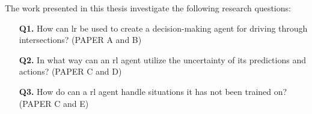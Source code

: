 
The work presented in this thesis investigate the following research questions:
\begin{enumerate}
	\item[\textbf{Q1.}] How can \gls{lr} be used to create a decision-making agent for driving through intersections? (PAPER A and B)
	\item[\textbf{Q2.}] In what way can an \gls{rl} agent utilize the uncertainty of its predictions and actions? (PAPER C and D)
	\item[\textbf{Q3.}] How do can a \gls{rl} agent handle situations it has not been trained on? (PAPER C and E)
	
\end{enumerate}

